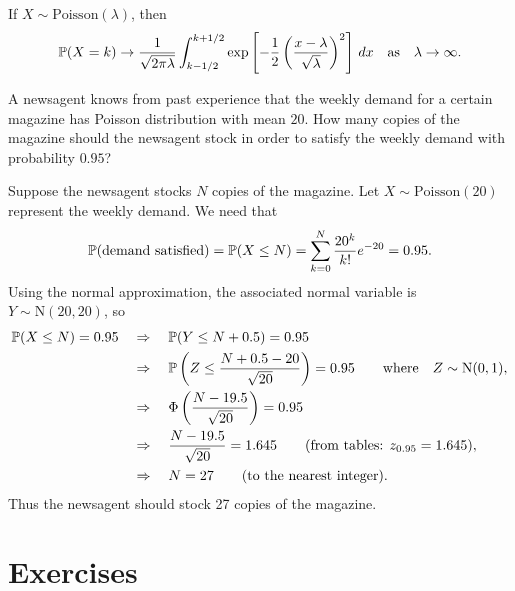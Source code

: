 \begin{theorem}
If $X\sim\text{Poisson}(\lambda)$, then
\[
\mathbb{P}(X=k)\to \frac{1}{\sqrt{2\pi\lambda}}\int_{k-1/2}^{k+1/2} \exp\left[-\frac{1}{2}\left(\frac{x-\lambda}{\sqrt{\lambda}}\right)^2\right]\,dx 
\quad\text{as}\quad \lambda\to\infty.
\]
\end{theorem}
\proofomitted

\begin{example}
A newsagent knows from past experience that the weekly demand for a certain magazine has Poisson distribution with mean $20$. How many copies of the magazine should the newsagent stock in order to satisfy the weekly demand with probability $0.95$?
\end{example}


\begin{solution}
Suppose the newsagent stocks $N$ copies of the magazine. Let $X\sim\text{Poisson}(20)$ represent the weekly demand. We need that 
\[
\mathbb{P}(\text{demand satisfied}) = \mathbb{P}(X\leq N) = \sum_{k=0}^{N}\frac{20^k}{k!}e^{-20} = 0.95.
\]
Using the normal approximation, the associated normal variable is $Y\sim\text{N}(20,20)$, so 
\begin{align*}
\mathbb{P}(X\leq N) = 0.95
	& \quad\Rightarrow\quad \mathbb{P}(Y \leq N + 0.5) = 0.95 \\
	& \quad\Rightarrow\quad \mathbb{P}\left(Z \leq \frac{N + 0.5 - 20}{\sqrt{20}}\right) = 0.95 \qquad\text{where}\quad Z\sim\text{N}(0,1), \\
	& \quad\Rightarrow\quad \Phi\left(\frac{N -19.5}{\sqrt{20}}\right) = 0.95 \\
	& \quad\Rightarrow\quad \frac{N -19.5}{\sqrt{20}} = 1.645 \qquad\text{(from tables: $z_{0.95} = 1.645$)},\\
	& \quad\Rightarrow\quad N = 27 \qquad\text{(to the nearest integer)}.
\end{align*}
Thus the newsagent should stock 27 copies of the magazine.
\end{solution}



\section{Exercises}


\endinput
